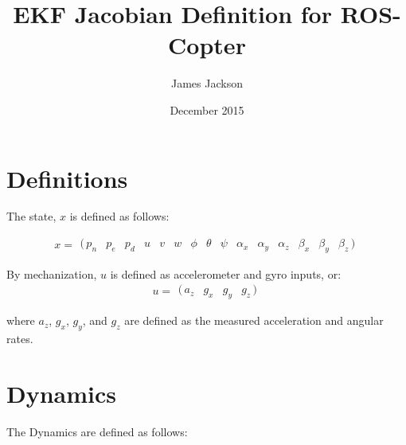 \documentclass{article}
\title{EKF Jacobian Definition for ROS-Copter}
\author{James Jackson}
\date{December 2015}
\newcommand{\irow}[1]{%
  \begin{smallmatrix}(\,#1\,)\end{smallmatrix}%
}
\begin{document}
\maketitle

\abstract{}

\section{Definitions}

The state, $x$ is defined as follows:

\begin{equation}
	x = \irow{
	    p_n & p_e & p_d & u & v & w & \phi & \theta & \psi & \alpha_x & \alpha_y & \alpha_z & \beta_x & \beta_y & \beta_z
	    }
\end{equation}

By mechanization, $u$ is defined as accelerometer and gyro inputs, or:
\begin{equation}
	u = \irow{
			a_z & g_x & g_y & g_z
			}
\end{equation}

where $a_z$, $g_x$, $g_y$, and $g_z$ are defined as the measured acceleration and angular rates.


\section{Dynamics}
The Dynamics are defined as follows:
\end{document}
